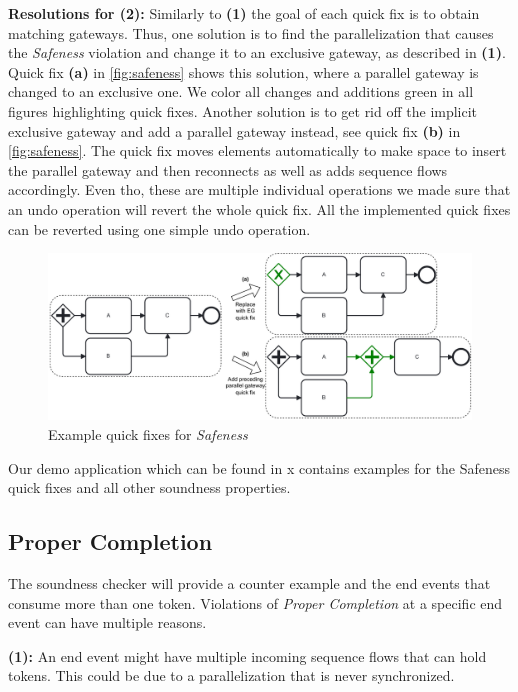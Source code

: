\documentclass[runningheads]{llncs}
\begin{document}
\textbf{Resolutions for (2):} Similarly to \textbf{(1)} the goal of each quick fix is to obtain matching gateways.
Thus, one solution is to find the parallelization that causes the \textit{Safeness} violation and change it to an exclusive gateway, as described in \textbf{(1)}.
Quick fix \textbf{(a)} in \autoref{fig:safeness} shows this solution, where a parallel gateway is changed to an exclusive one.
We color all changes and additions green in all figures highlighting quick fixes.
Another solution is to get rid off the implicit exclusive gateway and add a parallel gateway instead, see quick fix \textbf{(b)} in \autoref{fig:safeness}.
The quick fix moves elements automatically to make space to insert the parallel gateway and then reconnects as well as adds sequence flows accordingly.
Even tho, these are multiple individual operations we made sure that an undo operation will revert the whole quick fix.
All the implemented quick fixes can be reverted using one simple undo operation.

\begin{figure}[ht]
	\centering
	\includegraphics[width=1\textwidth]{images/safeness}
	\caption{Example quick fixes for \textit{Safeness}}
	\label{fig:safeness}
\end{figure}

Our demo application which can be found in x contains examples for the Safeness quick fixes and all other soundness properties.

\subsection{Proper Completion}
The soundness checker will provide a counter example and the end events that consume more than one token.
Violations of \textit{Proper Completion} at a specific end event can have multiple reasons.

\textbf{(1):} An end event might have multiple incoming sequence flows that can hold tokens.
This could be due to a parallelization that is never synchronized.
\end{document}
